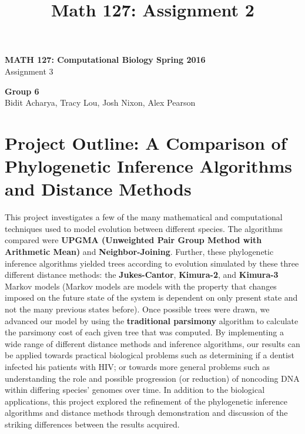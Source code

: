 \documentclass[11pt]{article}
\title{Math 127: Assignment 2}
\theoremstyle{definition}\newtheorem*{problem}{Problem}
\theoremstyle{remark}\newtheorem{claim}{Claim}
\theoremstyle{remark}\newtheorem*{sol}{Solution}
\begin{document}
\begin{center} {\Large \bf MATH 127: Computational Biology Spring 2016 } \\
                [8pt]{Assignment 3\\ [8pt]}\end{center}
                
                \begin{center} \textbf{Group 6}\\ Bidit Acharya, Tracy Lou, Josh Nixon, Alex Pearson
                \end{center}
                
\section{Project Outline: A Comparison of Phylogenetic Inference Algorithms and Distance Methods}

\par This project investigates a few of the many mathematical and computational techniques used to model evolution between different species. The algorithms compared were \textbf{UPGMA (Unweighted Pair Group Method with Arithmetic Mean)} and \textbf{Neighbor-Joining}. Further, these phylogenetic inference algorithms yielded trees according to evolution simulated by these three different distance methods: the \textbf{Jukes-Cantor}, \textbf{Kimura-2}, and \textbf{Kimura-3} Markov models (Markov models are models  with the property that changes imposed on the future state of the system is dependent on only present state and not the many previous states before). Once possible trees were drawn, we advanced our model by using the \textbf{traditional parsimony} algorithm to calculate the parsimony cost of each given tree that was computed. By implementing a wide range of different distance methods and inference algorithms, our results can be applied towards practical biological problems such as determining if a dentist infected his patients with HIV; or towards more general problems such as understanding the role and possible progression (or reduction) of noncoding DNA within differing species' genomes over time. In addition to the biological applications, this project explored the refinement of the phylogenetic inference algorithms and distance methods through demonstration and discussion of the striking differences between the results acquired.
\end{document}
